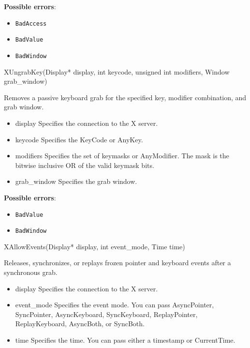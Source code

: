 \documentclass{report}
\begin{document}
\begin{itemize}
        \textbf{Possible errors}:
        \begin{itemize}
            \item \texttt{BadAccess}
            \item \texttt{BadValue}
            \item \texttt{BadWindow}
        \end{itemize}

        \begin{cppcode}
            XUngrabKey(Display* display, int keycode, unsigned int modifiers, Window grab_window)
        \end{cppcode}
        \bigbreak \noindent
        Removes a passive keyboard grab for the specified key, modifier combination, and grab window.

        \begin{itemize}
            \item display Specifies the connection to the X server.
            \item keycode Specifies the KeyCode or AnyKey.
            \item modifiers Specifies the set of keymasks or AnyModifier. The mask is the bitwise inclusive OR of the valid keymask bits.
            \item grab\_window Specifies the grab window.
        \end{itemize}

        \textbf{Possible errors}:
        \begin{itemize}
            \item \texttt{BadValue}
            \item \texttt{BadWindow}
        \end{itemize}

        \begin{cppcode}
        XAllowEvents(Display* display, int event_mode, Time time)
        \end{cppcode}
        \bigbreak \noindent
        Releases, synchronizes, or replays frozen pointer and keyboard events after a synchronous grab.

        \begin{itemize}
            \item display Specifies the connection to the X server.
            \item event\_mode Specifies the event mode. You can pass AsyncPointer, SyncPointer, AsyncKeyboard, SyncKeyboard, ReplayPointer, ReplayKeyboard, AsyncBoth, or SyncBoth.
            \item time Specifies the time. You can pass either a timestamp or CurrentTime.
        \end{itemize}


\end{itemize}
\end{document}

